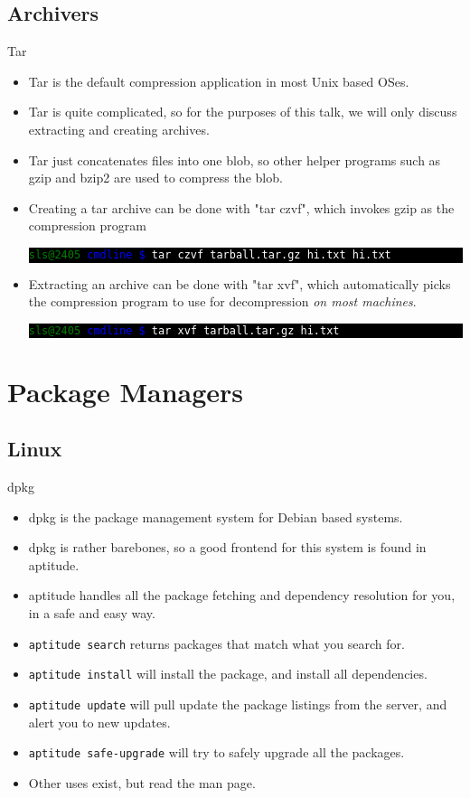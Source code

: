 \documentclass[10pt]{beamer}
\makeatletter
\newcommand{\codeblockWO}[2]
{
  \colorbox{black}{
    \begin{minipage}{\linewidth}
      \texttt{\textcolor{green}{sls@2405} \textcolor{blue}{cmdline \$} \textcolor{white}{#1}
      \newline
      \textcolor{white}{#2}}
    \end{minipage}
  }
}
\makeatother
\begin{document}
\subsection{Archivers}
\begin{frame}{Tar}
\begin{itemize}
\item Tar is the default compression application in most Unix based OSes.

\item Tar is quite complicated, so for the purposes of this talk, we will only discuss extracting and creating archives.

\item Tar just concatenates files into one blob, so other helper programs such as gzip and bzip2 are used to compress the blob.

\item Creating a tar archive can be done with "tar czvf", which invokes gzip as the compression program
\codeblockWO{tar czvf tarball.tar.gz hi.txt}{hi.txt}

\item Extracting an archive can be done with "tar xvf", which automatically picks the compression program to use for decompression \textit{on most machines}.
\codeblockWO{tar xvf tarball.tar.gz}{hi.txt}
\end{itemize}
\end{frame}

\section{Package Managers}

\subsection{Linux}
\begin{frame}{dpkg}
\begin{itemize}
\item dpkg is the package management system for Debian based systems.
\item dpkg is rather barebones, so a good frontend for this system is found in aptitude.
\item aptitude handles all the package fetching and dependency resolution for you, in a safe and easy way.
\item \texttt{\color{blue}aptitude search} returns packages that match what you search for.
\item \texttt{\color{blue}aptitude install} will install the package, and install all dependencies.
\item \texttt{\color{blue}aptitude update} will pull update the package listings from the server, and alert you to new updates.
\item \texttt{\color{blue}aptitude safe-upgrade} will try to safely upgrade all the packages.
\item Other uses exist, but read the man page.
\end{itemize}
\end{frame}
\end{document}
